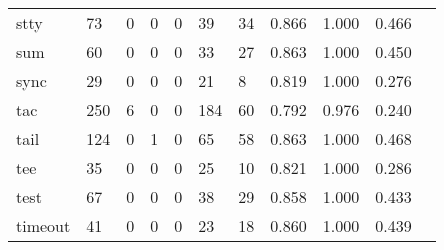 \begin{longtable}{lp{1.10cm}p{1.10cm}p{1.10cm}p{1.10cm}p{1.10cm}p{1.10cm}p{1.10cm}p{1.10cm}p{1.10cm}p{1.10cm}}
stty      &                     73 &                                  0 &                                 0 &                                0 &                                39 &                              34 &                          0.866 &                                 1.000 &                               0.466 \\
sum       &                     60 &                                  0 &                                 0 &                                0 &                                33 &                              27 &                          0.863 &                                 1.000 &                               0.450 \\
sync      &                     29 &                                  0 &                                 0 &                                0 &                                21 &                               8 &                          0.819 &                                 1.000 &                               0.276 \\
tac       &                    250 &                                  6 &                                 0 &                                0 &                               184 &                              60 &                          0.792 &                                 0.976 &                               0.240 \\
tail      &                    124 &                                  0 &                                 1 &                                0 &                                65 &                              58 &                          0.863 &                                 1.000 &                               0.468 \\
tee       &                     35 &                                  0 &                                 0 &                                0 &                                25 &                              10 &                          0.821 &                                 1.000 &                               0.286 \\
test      &                     67 &                                  0 &                                 0 &                                0 &                                38 &                              29 &                          0.858 &                                 1.000 &                               0.433 \\
timeout   &                     41 &                                  0 &                                 0 &                                0 &                                23 &                              18 &                          0.860 &                                 1.000 &                               0.439 \\

\end{longtable}
